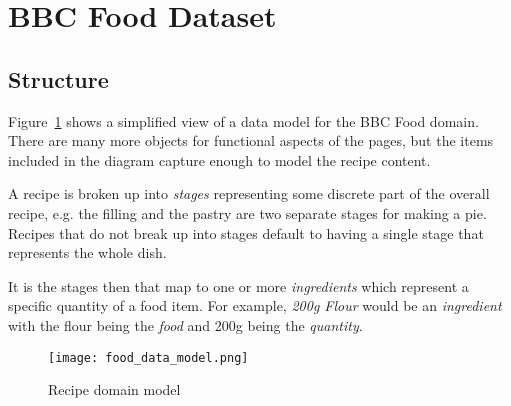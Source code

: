 \documentclass[11pt,a4paper]{article}
\begin{document}
\section{BBC Food Dataset}

\subsection{Structure}

Figure~\ref{model} shows a simplified view of a data model for the BBC Food
domain. There are many more objects for functional aspects of the pages, but
the items included in the diagram capture enough to model the recipe content.

A recipe is broken up into \emph{stages} representing some discrete part of the
overall recipe, e.g. the filling and the pastry are two separate stages for
making a pie. Recipes that do not break up into stages default to having a single
stage that represents the whole dish.

It is the stages then that map to one or more \emph{ingredients} which represent
a specific quantity of a food item. For example, \emph{200g Flour} would be an
\emph{ingredient} with the flour being the \emph{food} and 200g being the
\emph{quantity}.

\begin{comment}
  @startuml food_data_model.png
  
  skinparam monochrome true
  skinparam circledCharacterRadius 0
  skinparam circledCharacterFontSize 0
  skinparam classFontSize 20
  
  class Recipe
  class Stage
  class Cuisine
  class Ingredient {
    quantity
  }
  class Food
  class Diet
  class Method
  class Chef {
    firstName
    surname
  }
  class Programme
  class Occasion
  
  Recipe "0..*" -u- "1" Cuisine
  Recipe "1" -d- "1..*" Stage
  Stage "1" -- "1..*" Ingredient
  Ingredient "1..*" -r- "1" Food
  Diet "0..*" -- "0..*" Recipe
  Recipe "1" -l- "1..*" Method
  Recipe "1..*" -- "1" Chef
  Recipe "1..*" -r- "0..*" Programme
  Recipe "0..*" -d- "0..*" Occasion
  Food "0..*" -u- "0..*" Occasion
  
  @enduml
\end{comment}
\begin{figure}[p]
  \begin{center}
    \texttt{[image: food\_data\_model.png]}
  \end{center}
  \caption{Recipe domain model\label{model}}
\end{figure}
\end{document}

